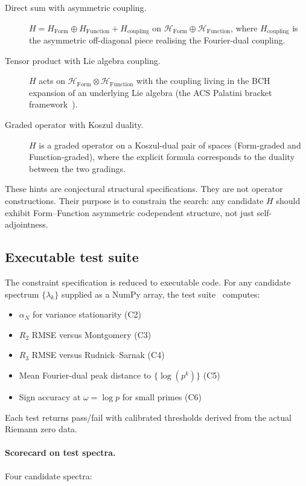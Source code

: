 \documentclass[11pt,a4paper]{article}
\theoremstyle{plain}
\theoremstyle{definition}
\theoremstyle{remark}
\begin{document}
\begin{description}
\item[Direct sum with asymmetric coupling.]
$H = H_{\text{Form}} \oplus H_{\text{Function}} + H_{\text{coupling}}$
on $\mathcal{H}_{\text{Form}} \oplus \mathcal{H}_{\text{Function}}$,
where $H_{\text{coupling}}$ is the asymmetric off-diagonal piece
realising the Fourier-dual coupling.

\item[Tensor product with Lie algebra coupling.]
$H$ acts on $\mathcal{H}_{\text{Form}} \otimes \mathcal{H}_{\text{Function}}$
with the coupling living in the BCH expansion of an underlying Lie algebra
(the ACS Palatini bracket framework~\cite{Wallace2026a}).

\item[Graded operator with Koszul duality.]
$H$ is a graded operator on a Koszul-dual pair of spaces (Form-graded
and Function-graded), where the explicit formula corresponds to the
duality between the two gradings.
\end{description}

These hints are conjectural structural specifications. They are not
operator constructions. Their purpose is to constrain the search:
any candidate $H$ should exhibit Form--Function asymmetric
codependent structure, not just self-adjointness.

\subsection{Executable test suite}
\label{sec:hp-tests}

The constraint specification is reduced to executable code. For any
candidate spectrum $\{\lambda_k\}$ supplied as a NumPy array, the
test suite~\cite{HPCode} computes:
\begin{itemize}
\item $\alpha_N$ for variance stationarity (C2)
\item $R_2$ RMSE versus Montgomery (C3)
\item $R_3$ RMSE versus Rudnick--Sarnak (C4)
\item Mean Fourier-dual peak distance to $\{\log(p^k)\}$ (C5)
\item Sign accuracy at $\omega = \log p$ for small primes (C6)
\end{itemize}
Each test returns pass/fail with calibrated thresholds derived from
the actual Riemann zero data.

\paragraph{Scorecard on test spectra.} Four candidate spectra:
\end{document}
